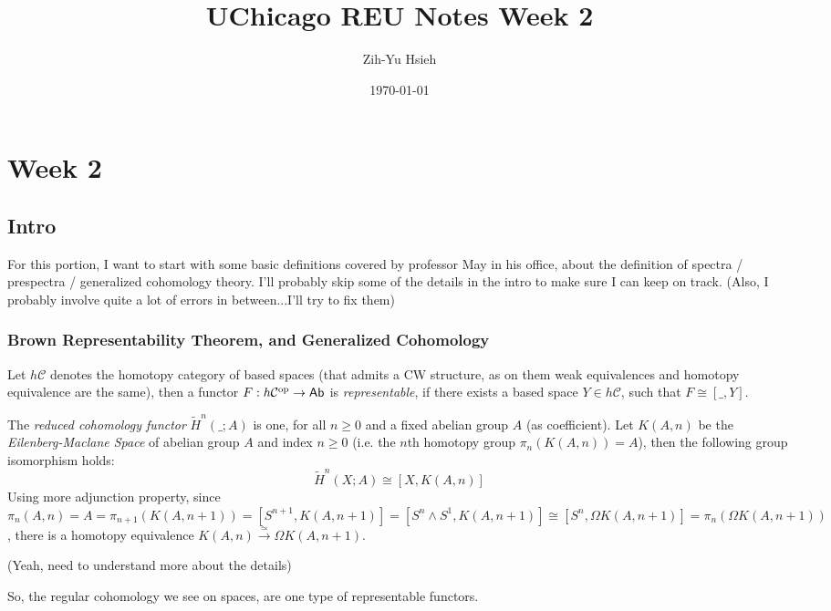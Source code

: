 \documentclass{article}
\title{UChicago REU Notes Week 2}
\author{Zih-Yu Hsieh}
\date{\today}
\begin{document}
\maketitle
\tableofcontents

\section{Week 2}

\subsection{Intro}
For this portion, I want to start with some basic definitions covered by professor May in his office, about the definition of spectra / prespectra / generalized cohomology theory. I'll probably skip some of the details in the intro to make sure I can keep on track. (Also, I probably involve quite a lot of errors in between...I'll try to fix them)
\subsubsection{Brown Representability Theorem, and Generalized Cohomology}
Let $h\mathcal{C}$ denotes the homotopy category of based spaces (that admits a CW structure, as on them weak equivalences and homotopy equivalence are the same), then a functor $F:h\mathcal{C}^{\mathrm{op}}\rightarrow \mathsf{Ab}$ is \emph{representable}, if there exists a based space $Y\in h\mathcal{C}$, such that $F\cong [\_,Y]$.
\begin{exmp}
    The \emph{reduced cohomology functor} $\tilde{H}^n(\_;A)$ is one, for all $n\geq 0$ and a fixed abelian group $A$ (as coefficient). Let $K(A,n)$ be the \emph{Eilenberg-Maclane Space} of abelian group $A$ and index $n\geq 0$ (i.e. the $n$th homotopy group $\pi_n (K(A,n))=A$), then the following group isomorphism holds:
    \[\tilde{H}^n(X;A) \cong [X, K(A,n)]\]
    Using more adjunction property, since $\pi_n (A,n) = A = \pi_{n+1}(K(A,n+1)) = [S^{n+1}, K(A,n+1)] = [S^n \wedge S^1, K(A,n+1)] \cong [S^n, \Omega K(A,n+1)]= \pi_n (\Omega K(A,n+1))$, there is a homotopy equivalence $K(A,n)\xrightarrow{\simeq} \Omega K(A,n+1)$.
\end{exmp} 

(Yeah, need to understand more about the details)

So, the regular cohomology we see on spaces, are one type of representable functors.
\end{document}
